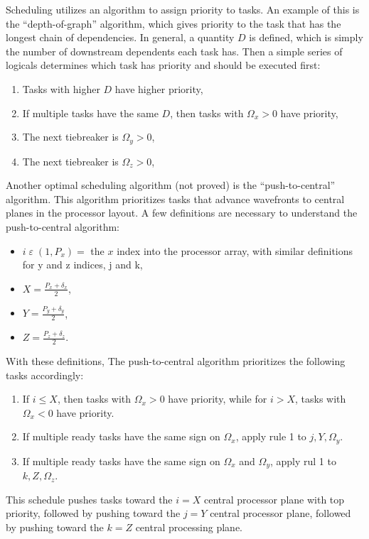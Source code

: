 \documentclass[11pt, letterpaper,titlepage,oneside]{article}
\begin{document}
Scheduling utilizes an algorithm to assign priority to tasks. An example of this is the ``depth-of-graph'' algorithm, which gives priority to the task that has the longest chain of dependencies. In general, a quantity $D$ is defined, which is simply the number of downstream dependents each task has. Then a simple series of logicals determines which task has priority and should be executed first:

\begin{enumerate}
\item Tasks with higher $D$ have higher priority,
\item If multiple tasks have the same $D$, then tasks with $\Omega_x > 0$ have priority,
\item The next tiebreaker is $\Omega_y > 0$,
\item The next tiebreaker is $\Omega_z > 0$,
\end{enumerate}

Another optimal scheduling algorithm (not proved) is the ``push-to-central'' algorithm. This algorithm prioritizes tasks that advance wavefronts to central planes in the processor layout. A few definitions are necessary to understand the push-to-central algorithm:

\begin{itemize}
\item $i \; \varepsilon \; (1,P_x) = $ the $x$ index into the processor array, with similar definitions for y and z indices, j and k,
\item $X = \frac{P_x + \delta_x}{2}$,
\item $Y = \frac{P_y + \delta_y}{2}$,
\item $Z = \frac{P_z + \delta_z}{2}$.
\end{itemize}

With these definitions, The push-to-central algorithm prioritizes the following tasks accordingly:

\begin{enumerate}
\item If $i \leq X$, then tasks with $\Omega_x > 0$ have priority, while for $i > X$, tasks with $\Omega_x < 0$ have priority.
\item If multiple ready tasks have the same sign on $\Omega_x$, apply rule 1 to $j,Y,\Omega_y$.
\item If multiple ready tasks have the same sign on $\Omega_x$ and $\Omega_y$, apply rul 1 to $k,Z, \Omega_z$.
\end{enumerate}

This schedule pushes tasks toward the $i = X$ central processor plane with top priority, followed by pushing toward the $j = Y$ central processor plane, followed by pushing toward the $k = Z$ central processing plane.
\end{document}
